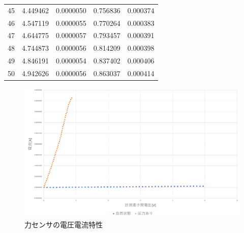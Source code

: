 \begin{table}[h]
{\begin{tabular}{ccccc}
45 & 4.449462 & 0.0000050  & 0.756836 & 0.000374 \\
46 & 4.547119 & 0.0000055  & 0.770264 & 0.000383 \\
47 & 4.644775 & 0.0000057  & 0.793457 & 0.000391 \\
48 & 4.744873 & 0.0000056  & 0.814209 & 0.000398 \\
49 & 4.846191 & 0.0000054  & 0.837402 & 0.000406 \\
50 & 4.942626 & 0.0000056  & 0.863037 & 0.000414 \\
\hline
\end{tabular}
}
\end{table}

\begin{figure}[h]
\centering
\includegraphics[scale=0.45]{./fig/3-4.pdf}
\caption{力センサの電圧電流特性}
\label{fig:3-4}
\end{figure}